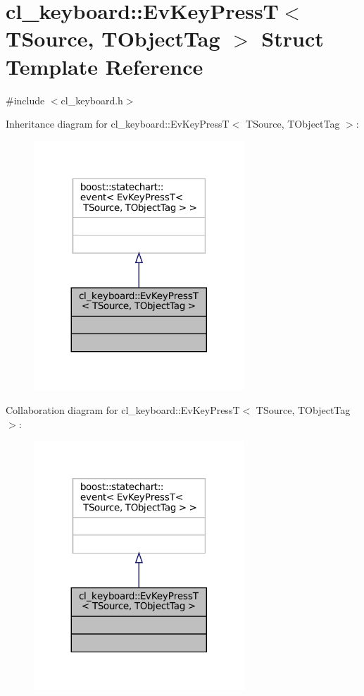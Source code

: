 \hypertarget{structcl__keyboard_1_1EvKeyPressT}{}\section{cl\+\_\+keyboard\+:\+:Ev\+Key\+PressT$<$ T\+Source, T\+Object\+Tag $>$ Struct Template Reference}
\label{structcl__keyboard_1_1EvKeyPressT}


{\ttfamily \#include $<$cl\+\_\+keyboard.\+h$>$}



Inheritance diagram for cl\+\_\+keyboard\+:\+:Ev\+Key\+PressT$<$ T\+Source, T\+Object\+Tag $>$\+:
\nopagebreak
\begin{figure}[H]
\begin{center}
\leavevmode
\includegraphics[width=224pt]{structcl__keyboard_1_1EvKeyPressT__inherit__graph}
\end{center}
\end{figure}


Collaboration diagram for cl\+\_\+keyboard\+:\+:Ev\+Key\+PressT$<$ T\+Source, T\+Object\+Tag $>$\+:
\nopagebreak
\begin{figure}[H]
\begin{center}
\leavevmode
\includegraphics[width=224pt]{structcl__keyboard_1_1EvKeyPressT__coll__graph}
\end{center}
\end{figure}



